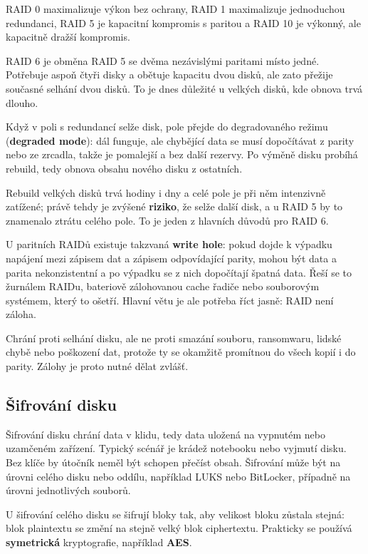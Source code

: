 RAID 0 maximalizuje výkon bez ochrany, RAID 1 maximalizuje jednoduchou redundanci, RAID 5 je kapacitní kompromis s paritou a RAID 10 je výkonný, ale kapacitně dražší kompromis.

RAID 6 je obměna RAID 5 se dvěma nezávislými paritami místo jedné. Potřebuje aspoň čtyři disky a obětuje kapacitu dvou disků, ale zato přežije současné selhání dvou disků. To je dnes důležité u velkých disků, kde obnova trvá dlouho.

Když v poli s redundancí selže disk, pole přejde do degradovaného režimu (\textbf{degraded mode}): dál funguje, ale chybějící data se musí dopočítávat z parity nebo ze zrcadla, takže je pomalejší a bez další rezervy. Po výměně disku probíhá rebuild, tedy obnova obsahu nového disku z ostatních.

Rebuild velkých disků trvá hodiny i dny a celé pole je při něm intenzivně zatížené; právě tehdy je zvýšené \textbf{riziko}, že selže další disk, a u RAID 5 by to znamenalo ztrátu celého pole. To je jeden z hlavních důvodů pro RAID 6.

U paritních RAIDů existuje takzvaná \textbf{write hole}: pokud dojde k výpadku napájení mezi zápisem dat a zápisem odpovídající parity, mohou být data a parita nekonzistentní a po výpadku se z nich dopočítají špatná data. Řeší se to žurnálem RAIDu, bateriově zálohovanou cache řadiče nebo souborovým systémem, který to ošetří. Hlavní větu je ale potřeba říct jasně: RAID není záloha.

Chrání proti selhání disku, ale ne proti smazání souboru, ransomwaru, lidské chybě nebo poškození dat, protože ty se okamžitě promítnou do všech kopií i do parity. Zálohy je proto nutné dělat zvlášť.

\subsection*{Šifrování disku}

Šifrování disku chrání data v klidu, tedy data uložená na vypnutém nebo uzamčeném zařízení. Typický scénář je krádež notebooku nebo vyjmutí disku. Bez klíče by útočník neměl být schopen přečíst obsah. Šifrování může být na úrovni celého disku nebo oddílu, například LUKS nebo BitLocker, případně na úrovni jednotlivých souborů.

U šifrování celého disku se šifrují bloky tak, aby velikost bloku zůstala stejná: blok plaintextu se změní na stejně velký blok ciphertextu. Prakticky se používá \textbf{symetrická} kryptografie, například \textbf{AES}.

